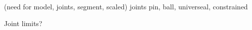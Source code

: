 (need for model, joints, segment, scaled) 
joints pin, ball, universeal, constrained

Joint limits?






